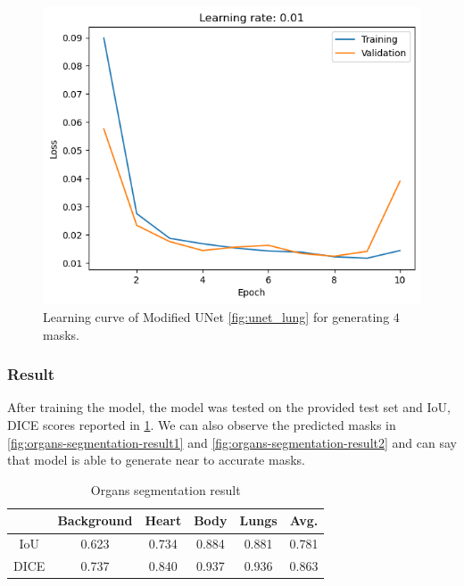     \begin{figure}[htbp]
        \centering
        \includegraphics[width=\linewidth]{../plots/segmentation2/learning.png}
        \caption{Learning curve of Modified UNet \cref{fig:unet_lung} for generating $4$ masks.}
        \label{fig:organs-segmentation-learning-curve}
    \end{figure}


    \subsubsection{Result}
    
    After training the model, the model was tested on the provided test set and IoU, DICE scores reported in \cref{tab:organ-segmentation-result}. We can also observe the predicted masks in \cref{fig:organs-segmentation-result1} and \cref{fig:organs-segmentation-result2} and can say that model is able to generate near to accurate masks.

    \begin{table}
        \centering
        \begin{tabular}{cccccc}
          \toprule
            & Background & Heart & Body & Lungs & Avg. \\
          \midrule
           IoU & 0.623 & 0.734 & 0.884 & 0.881 & 0.781 \\
           DICE & 0.737 & 0.840 & 0.937 & 0.936 & 0.863 \\
          \bottomrule
        \end{tabular}
        \caption{Organs segmentation result}
        \label{tab:organ-segmentation-result}
      \end{table}

